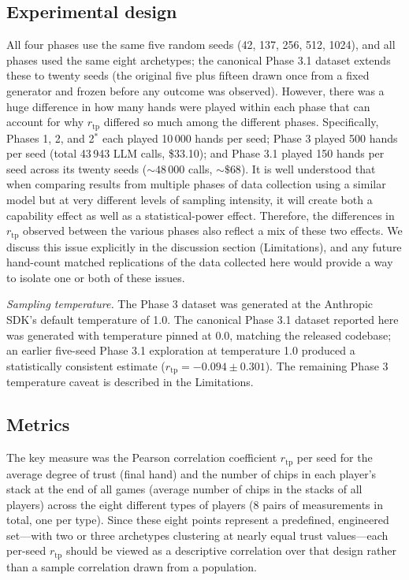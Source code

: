 \documentclass[10pt,twocolumn,letterpaper]{article}
\newcommand{\rtp}{\ensuremath{r_{\mathrm{tp}}}}
\begin{document}
\subsection{Experimental design}
All four phases use the same five random seeds (42, 137, 256, 512, 1024), and all phases used the same eight archetypes; the canonical Phase 3.1 dataset extends these to twenty seeds (the original five plus fifteen drawn once from a fixed generator and frozen before any outcome was observed). However, there
was a huge difference in how many hands were played within each
phase that can account for why $\rtp$ differed so much among the
different phases. Specifically, Phases 1, 2, and 2$^{*}$ each played
10\,000 hands per seed; Phase 3 played 500 hands per seed (total
43\,943 LLM calls, \$33.10); and Phase 3.1 played 150 hands per seed across its twenty seeds (${\sim}48\,000$ calls, ${\sim}\$68$). It is well understood that when
comparing results from multiple phases of data collection using a
similar model but at very different levels of sampling intensity, it
will create both a capability effect as well as a statistical-power
effect. Therefore, the differences in $\rtp$ observed between the
various phases also reflect a mix of these two effects. We discuss
this issue explicitly in the discussion section (Limitations), and
any future hand-count matched replications of the data collected
here would provide a way to isolate one or both of these issues.

\textit{Sampling temperature.} The Phase 3 dataset was generated at the Anthropic SDK's default temperature of 1.0. The canonical Phase 3.1 dataset reported here was generated with temperature pinned at 0.0, matching the released codebase; an earlier five-seed Phase 3.1 exploration at temperature 1.0 produced a statistically consistent estimate ($\rtp = -0.094 \pm 0.301$). The remaining Phase 3 temperature caveat is described in the Limitations.

\subsection{Metrics}
The key measure was the Pearson correlation coefficient $\rtp$ per
seed for the average degree of trust (final hand) and the number of
chips in each player's stack at the end of all games (average number
of chips in the stacks of all players) across the eight different
types of players (8 pairs of measurements in total, one per type).
Since these eight points represent a predefined, engineered
set---with two or three archetypes clustering at nearly equal trust
values---each per-seed $\rtp$ should be viewed as a descriptive
correlation over that design rather than a sample correlation drawn
from a population.
\end{document}
